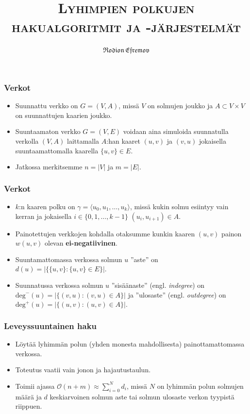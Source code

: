 \documentclass{beamer}
\title{{\rmfamily\scshape Lyhimpien polkujen hakualgoritmit ja -järjestelmät}}
\author{$\mathfrak{Rodion \, Efremov}$}
\date{}
\institute{Tietojenkäsittelytieteen laitos, Helsingin yliopisto}
\begin{document}
\maketitle

\begin{frame}
  \frametitle{Verkot}
  \begin{itemize}
    \item Suunnattu verkko on $G = (V, A)$, missä $V$ on solmujen joukko ja $A \subset V \times V$ on suunnattujen kaarien joukko.

    \item Suuntaamaton verkko $G = (V, E)$ voidaan aina simuloida suunnatulla verkolla $(V, A)$ laittamalla $A$:han kaaret $(u, v)$ ja $(v, u)$ jokaisella suuntaamattomalla kaarella $\{u, v\} \in E$.

    \item Jatkossa merkitsemme $n = |V|$ ja $m = |E|$.
  \end{itemize}
\end{frame}

\begin{frame}
  \frametitle{Verkot}
  \begin{itemize}
    \item $k$:n kaaren polku on $\gamma = \langle u_0, u_1, \dots, u_k \rangle$, missä kukin solmu esiintyy vain kerran ja jokaisella $i \in \{ 0, 1, \dots, k - 1 \}$ $(u_i, u_{i + 1}) \in A$.

    \item Painotettujen verkkojen kohdalla otaksumme kunkin kaaren $(u, v)$ painon $w(u, v)$ olevan \textbf{ei-negatiivinen}.
    
    \item Suuntamattomassa verkossa solmun $u$ ''aste'' on $d(u) = |\{ \{u, v\} \colon \{ u, v \} \in E \}|$. 
    
    \item Suunnatussa verkossa solmun $u$ ''sisäänaste'' (engl. \textit{indegree}) on $\textrm{deg}^-(u) = | \{ (v, u) \colon (v, u) \in A \} |$ ja
      ''ulosaste'' (engl. \textit{outdegree}) on $\textrm{deg}^+(u) = | \{ (u, v) \colon (u, v) \in A \} |$.
  \end{itemize}
\end{frame}

\begin{frame}
\frametitle{Leveyssuuntainen haku}
\begin{itemize}
\item Löytää lyhimmän polun (yhden monesta mahdollisesta) painottamattomassa verkossa.
\item Toteutus vaatii vain jonon ja hajautustaulun.
\item Toimii ajassa $\mathcal{O}(n + m) \approx \sum_{i = 0}^N d_i$, missä $N$ on lyhimmän polun solmujen määrä ja $d$ keskiarvoinen solmun aste tai solmun ulosaste verkon tyypistä riippuen.
\end{itemize}
\end{frame}
\end{document}
